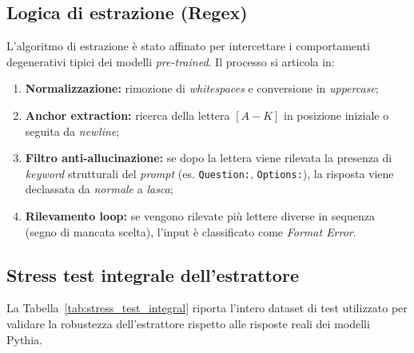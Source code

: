 \documentclass[../relazione.tex]{subfiles}
\begin{document}
\subsection{Logica di estrazione (Regex)}
L'algoritmo di estrazione è stato affinato per intercettare i comportamenti degenerativi tipici dei modelli \textit{pre-trained}. Il processo si articola in:
\begin{enumerate}
    \item \textbf{Normalizzazione:} rimozione di \textit{whitespaces} e conversione in \textit{uppercase};
    \item \textbf{Anchor extraction:} ricerca della lettera $[A-K]$ in posizione iniziale o seguita da \textit{newline};
    \item \textbf{Filtro anti-allucinazione:} se dopo la lettera viene rilevata la presenza di \textit{keyword} strutturali del \textit{prompt} (es. \texttt{Question:}, \texttt{Options:}), la risposta viene declassata da \textit{normale} a \textit{lasca};
    \item \textbf{Rilevamento loop:} se vengono rilevate più lettere diverse in sequenza (segno di mancata scelta), l'input è classificato come \textit{Format Error}.
\end{enumerate}

\subsection{Stress test integrale dell'estrattore}

La Tabella~\ref{tab:stress_test_integral} riporta l'intero dataset di test utilizzato per validare la robustezza dell'estrattore rispetto alle risposte reali dei modelli Pythia.
\end{document}
